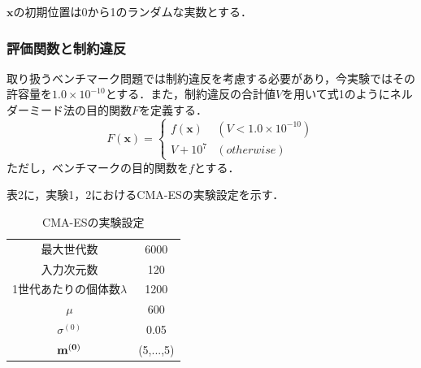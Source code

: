 \documentclass[twocolumn]{jarticle}
\begin{document}
		$\bm{x}$の初期位置は0から1のランダムな実数とする．

		\subsubsection{評価関数と制約違反}
			取り扱うベンチマーク問題では制約違反を考慮する必要があり，今実験ではその許容量を$1.0\times10^{-10}$とする．また，制約違反の合計値$V$を用いて式1のようにネルダーミード法の目的関数$F$を定義する．
			\begin{equation}	%
				F(\bm{x}) = \begin{cases}
					f(\bm{x}) & (V < 1.0\times10^{-10}) \\
					V + 10^7 & (otherwise)
				\end{cases}
			\end{equation}
			ただし，ベンチマークの目的関数を$f$とする．

		表2に，実験1，2におけるCMA-ESの実験設定を示す．
		\begin{table}[htbp] %
			\begin{center}
				\caption{CMA-ESの実験設定}
				\begin{tabular}{| c | c |} \hline
					最大世代数 & 6000 \\
					入力次元数 & 120 \\
					1世代あたりの個体数$\lambda$ & 1200 \\
					$\mu$ & 600 \\
					$\sigma^{(0)}$ & 0.05 \\ 
					$\bf{m}^{(0)}$ &  (5,...,5) \\ \hline
				\end{tabular}
			\end{center}
		\end{table}
\end{document}
